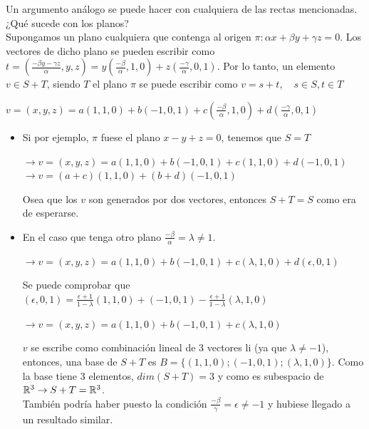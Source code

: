 \begin{enumerate}
\begin{mdframed}[style=s]
                Un argumento análogo se puede hacer con cualquiera de las rectas mencionadas. ¿Qué sucede con los planos?\\
                Supongamos un plano cualquiera que contenga al origen $\pi:\alpha x+\beta y+\gamma z=0$. Los vectores de dicho plano se pueden escribir como $t=(\frac{-\beta y-\gamma z}{\alpha},y,z)=y(\frac{-\beta}{\alpha},1,0)+z(\frac{-\gamma}{\alpha},0,1)$. Por lo tanto, un elemento $v\in S+T$, siendo $T$ el plano $\pi$ se puede escribir como $v=s+t,\quad s\in S,t\in T$
                \begin{center}
                    $v=(x,y,z)=a(1,1,0)+b(-1,0,1)+c(\frac{-\beta}{\alpha},1,0)+d(\frac{-\gamma}{\alpha},0,1)$\\
                \end{center}
                \begin{itemize}
                    \item Si por ejemplo, $\pi$ fuese el plano $x-y+z=0$, tenemos que $S=T$
                        \begin{center}
                            $\to v=(x,y,z)=a(1,1,0)+b(-1,0,1)+c(1,1,0)+d(-1,0,1)$\\
                            $\to v=(a+c)(1,1,0)+(b+d)(-1,0,1)$
                        \end{center}
                        Osea que los $v$ son generados por dos vectores, entonces $S+T=S$ como era de esperarse.
                    \item En el caso que tenga otro plano $\frac{-\beta}{\alpha}=\lambda\neq 1$.
                        \begin{center}
                            $\to v=(x,y,z)=a(1,1,0)+b(-1,0,1)+c(\lambda,1,0)+d(\epsilon,0,1)$
                        \end{center}
                        Se puede comprobar que $(\epsilon,0,1)=\frac{\epsilon+1}{1-\lambda}(1,1,0)+(-1,0,1)-\frac{\epsilon+1}{1-\lambda}(\lambda,1,0)$
                        \begin{center}
                            $\to v=(x,y,z)=a(1,1,0)+b(-1,0,1)+c(\lambda,1,0)$
                        \end{center}
                        $v$ se escribe como combinación lineal de 3 vectores li (ya que $\lambda\neq -1$), entonces, una base de $S+T$ es $B=\{(1,1,0);(-1,0,1);(\lambda,1,0)\}$. Como la base tiene 3 elementos, $dim(S+T)=3$ y como es subespacio de $\mathbb{R}^3\to S+T=\mathbb{R}^3$.\\
                        También podría haber puesto la condición $\frac{-\beta}{\gamma}=\epsilon\neq -1$ y hubiese llegado a un resultado similar.

\end{itemize}
\end{mdframed}
\end{enumerate}
